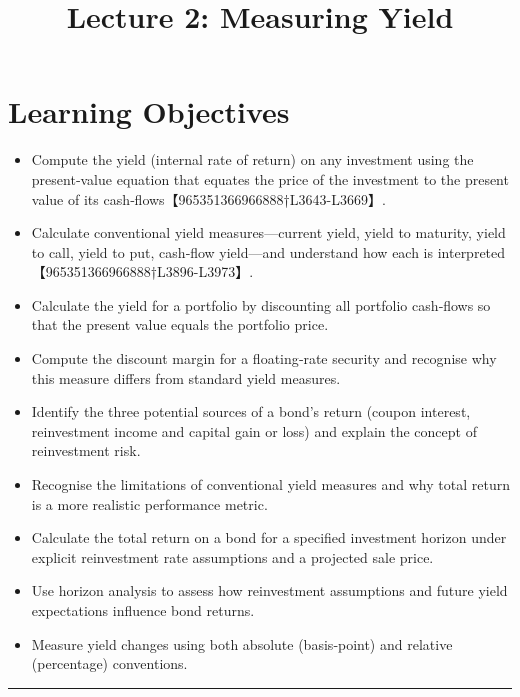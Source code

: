\documentclass[
  letterpaper,
  DIV=11,
  numbers=noendperiod]{scrartcl}
\title{Lecture 2: Measuring Yield}
\author{}
\date{}
\providecommand{\tightlist}{%
  \setlength{\itemsep}{0pt}\setlength{\parskip}{0pt}}
\renewcommand*\contentsname{Table of contents}
\newcommand\contentsname{Table of contents}
\begin{document}
\maketitle

\renewcommand*\contentsname{Table of contents}
{
\hypersetup{linkcolor=}
\setcounter{tocdepth}{3}
\tableofcontents
}

\section{Learning Objectives}\label{learning-objectives}

\begin{itemize}
\tightlist
\item
  Compute the yield (internal rate of return) on any investment using
  the present‑value equation that equates the price of the investment to
  the present value of its cash‑flows【965351366966888†L3643-L3669】.
\item
  Calculate conventional yield measures---current yield, yield to
  maturity, yield to call, yield to put, cash‑flow yield---and
  understand how each is interpreted【965351366966888†L3896-L3973】.
\item
  Calculate the yield for a portfolio by discounting all portfolio
  cash‑flows so that the present value equals the portfolio price.
\item
  Compute the discount margin for a floating‑rate security and recognise
  why this measure differs from standard yield measures.
\item
  Identify the three potential sources of a bond's return (coupon
  interest, reinvestment income and capital gain or loss) and explain
  the concept of reinvestment risk.
\item
  Recognise the limitations of conventional yield measures and why total
  return is a more realistic performance metric.
\item
  Calculate the total return on a bond for a specified investment
  horizon under explicit reinvestment rate assumptions and a projected
  sale price.
\item
  Use horizon analysis to assess how reinvestment assumptions and future
  yield expectations influence bond returns.
\item
  Measure yield changes using both absolute (basis‑point) and relative
  (percentage) conventions.
\end{itemize}

\begin{center}\rule{0.5\linewidth}{0.5pt}\end{center}
\end{document}
